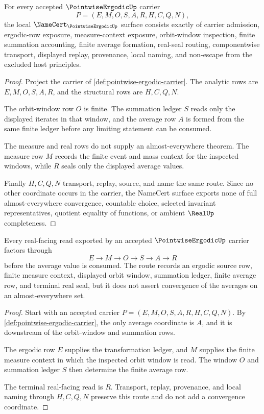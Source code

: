 \begin{theorem}
\label{thm:pointwise-ergodic-namecert-obligations}
For every accepted $\PointwiseErgodicUp$ carrier
$$
P=(E,M,O,S,A,R,H,C,Q,N),
$$
the local $\NameCert_{\PointwiseErgodicUp}$ surface consists exactly of carrier admission, ergodic-row exposure, measure-context exposure, orbit-window inspection, finite summation accounting, finite average formation, real-seal routing, componentwise transport, displayed replay, provenance, local naming, and non-escape from the excluded host principles.
\end{theorem}
\begin{proof}
Project the carrier of \autoref{def:pointwise-ergodic-carrier}. The analytic rows are $E,M,O,S,A,R$, and the structural rows are $H,C,Q,N$.

The orbit-window row $O$ is finite. The summation ledger $S$ reads only the displayed iterates in that window, and the average row $A$ is formed from the same finite ledger before any limiting statement can be consumed.

The measure and real rows do not supply an almost-everywhere theorem. The measure row $M$ records the finite event and mass context for the inspected windows, while $R$ seals only the displayed average values.

Finally $H,C,Q,N$ transport, replay, source, and name the same route. Since no other coordinate occurs in the carrier, the NameCert surface exports none of full almost-everywhere convergence, countable choice, selected invariant representatives, quotient equality of functions, or ambient $\RealUp$ completeness.
\end{proof}

\begin{theorem}
\label{thm:pointwise-ergodic-finite-average-route}
Every real-facing read exported by an accepted $\PointwiseErgodicUp$ carrier factors through
$$
E \to M \to O \to S \to A \to R
$$
before the average value is consumed. The route records an ergodic source row, finite measure context, displayed orbit window, summation ledger, finite average row, and terminal real seal, but it does not assert convergence of the averages on an almost-everywhere set.
\end{theorem}
\begin{proof}
Start with an accepted carrier $P=(E,M,O,S,A,R,H,C,Q,N)$. By \autoref{def:pointwise-ergodic-carrier}, the only average coordinate is $A$, and it is downstream of the orbit-window and summation rows.

The ergodic row $E$ supplies the transformation ledger, and $M$ supplies the finite measure context in which the inspected orbit window is read. The window $O$ and summation ledger $S$ then determine the finite average row.

The terminal real-facing read is $R$. Transport, replay, provenance, and local naming through $H,C,Q,N$ preserve this route and do not add a convergence coordinate.
\end{proof}

